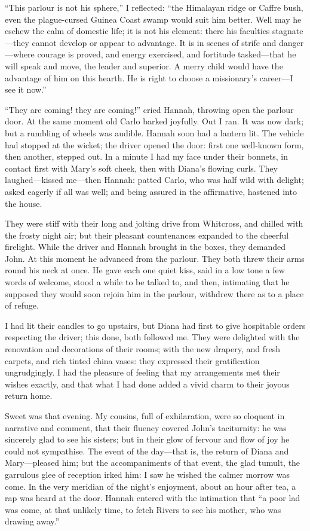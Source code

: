 \enquote{This parlour is not his sphere,} I reflected: \enquote{the
	Himalayan ridge or Caffre bush, even the plague-cursed Guinea Coast
	swamp would suit him better. Well may he eschew the calm of domestic
	life; it is not his element: there his faculties stagnate---they cannot
	develop or appear to advantage. It is in scenes of strife and
	danger---where courage is proved, and energy exercised, and fortitude
	tasked---that he will speak and move, the leader and superior. A merry
	child would have the advantage of him on this hearth. He is right to
	choose a missionary's career---I see it now.}

\enquote{They are coming! they are coming!} cried Hannah, throwing open
the parlour door. At the same moment old Carlo barked joyfully. Out I
ran. It was now dark; but a rumbling of wheels was audible. Hannah
soon had a lantern lit. The vehicle had stopped at the wicket; the
driver opened the door: first one well-known form, then another, stepped
out. In a minute I had my face under their bonnets, in contact first
with Mary's soft cheek, then with Diana's flowing curls. They
laughed---kissed me---then Hannah: patted Carlo, who was half wild with
delight; asked eagerly if all was well; and being assured in the
affirmative, hastened into the house.

They were stiff with their long and jolting drive from Whitcross, and
chilled with the frosty night air; but their pleasant countenances
expanded to the cheerful firelight. While the driver and Hannah brought
in the boxes, they demanded \St{} John. At this moment he advanced from
the parlour. They both threw their arms round his neck at once. He
gave each one quiet kiss, said in a low tone a few words of welcome,
stood a while to be talked to, and then, intimating that he supposed
they would soon rejoin him in the parlour, withdrew there as to a place
of refuge.

I had lit their candles to go upstairs, but Diana had first to give
hospitable orders respecting the driver; this done, both followed me.
They were delighted with the renovation and decorations of their rooms;
with the new drapery, and fresh carpets, and rich tinted china vases:
they expressed their gratification ungrudgingly. I had the pleasure of
feeling that my arrangements met their wishes exactly, and that what I
had done added a vivid charm to their joyous return home.

Sweet was that evening. My cousins, full of exhilaration, were so
eloquent in narrative and comment, that their fluency covered \St{} John's
taciturnity: he was sincerely glad to see his sisters; but in their glow
of fervour and flow of joy he could not sympathise. The event of the
day---that is, the return of Diana and Mary---pleased him; but the
accompaniments of that event, the glad tumult, the garrulous glee of
reception irked him: I saw he wished the calmer morrow was come. In the
very meridian of the night's enjoyment, about an hour after tea, a rap
was heard at the door. Hannah entered with the intimation that
\enquote{a poor lad was come, at that unlikely time, to fetch \Mr{} Rivers
	to see his mother, who was drawing away.}

